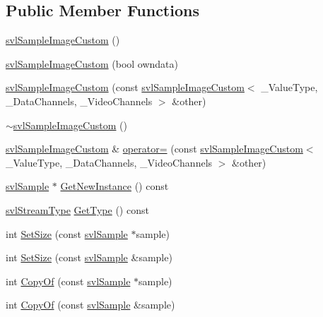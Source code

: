 \subsection*{Public Member Functions}
\begin{DoxyCompactItemize}
\item 
\hyperlink{classsvl_sample_image_custom_a86f142472177a135cb61356844af0469}{svl\-Sample\-Image\-Custom} ()
\item 
\hyperlink{classsvl_sample_image_custom_ac35ed25ee803ef4f9fdc4e943218c086}{svl\-Sample\-Image\-Custom} (bool owndata)
\item 
\hyperlink{classsvl_sample_image_custom_a24e50aadebb3d4248927c67c08697419}{svl\-Sample\-Image\-Custom} (const \hyperlink{classsvl_sample_image_custom}{svl\-Sample\-Image\-Custom}$<$ \-\_\-\-Value\-Type, \-\_\-\-Data\-Channels, \-\_\-\-Video\-Channels $>$ \&other)
\item 
\hyperlink{classsvl_sample_image_custom_a80105437289d7effcb730c4a86b0d09b}{$\sim$svl\-Sample\-Image\-Custom} ()
\item 
\hyperlink{classsvl_sample_image_custom}{svl\-Sample\-Image\-Custom} \& \hyperlink{classsvl_sample_image_custom_a279b02550bf93dde5d65f1baf99392fd}{operator=} (const \hyperlink{classsvl_sample_image_custom}{svl\-Sample\-Image\-Custom}$<$ \-\_\-\-Value\-Type, \-\_\-\-Data\-Channels, \-\_\-\-Video\-Channels $>$ \&other)
\item 
\hyperlink{classsvl_sample}{svl\-Sample} $\ast$ \hyperlink{classsvl_sample_image_custom_aeb7b03acbcec862fc59c6dcac98209b0}{Get\-New\-Instance} () const 
\item 
\hyperlink{svl_definitions_8h_aa00696d338a58db361335a01fd11e122}{svl\-Stream\-Type} \hyperlink{classsvl_sample_image_custom_a07cb7b6e330adc6332fc334283f2b70d}{Get\-Type} () const 
\item 
int \hyperlink{classsvl_sample_image_custom_a67274b637cf728989b840642d9947c22}{Set\-Size} (const \hyperlink{classsvl_sample}{svl\-Sample} $\ast$sample)
\item 
int \hyperlink{classsvl_sample_image_custom_af573cdf05b8b2bc88fa059e9e01c1bde}{Set\-Size} (const \hyperlink{classsvl_sample}{svl\-Sample} \&sample)
\item 
int \hyperlink{classsvl_sample_image_custom_add5fb5b28b462591ee5920ae62cb59f3}{Copy\-Of} (const \hyperlink{classsvl_sample}{svl\-Sample} $\ast$sample)
\item 
int \hyperlink{classsvl_sample_image_custom_ab84806d39cdabe6d0e3cdd8edad4ee5e}{Copy\-Of} (const \hyperlink{classsvl_sample}{svl\-Sample} \&sample)

\end{DoxyCompactItemize}
